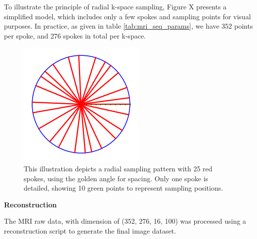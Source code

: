 \documentclass{micro-econ-thesis}
\begin{document}
To illustrate the principle of radial k-space sampling, Figure X presents a simplified model, which includes only a few spokes and sampling points for visual purposes. In practice, as given in table \ref{tab:mri_seq_params}, we have 352 points per spoke, and 276 spokes in total per k-space. 

\begin{figure}[H]
	\centering
	\includegraphics[width=0.7\linewidth]{kspace_depiction}
	\caption{This illustration depicts a radial sampling pattern with 25 red spokes, using the golden angle for spacing. Only one spoke is detailed, showing 10 green points to represent sampling positions.}
	\label{fig:kspacedepiction}
\end{figure}

\textbf{Reconstruction}


The MRI raw data, with dimension of (352, 276, 16, 100) was processed using a reconstruction script to generate the final image dataset.
\end{document}
